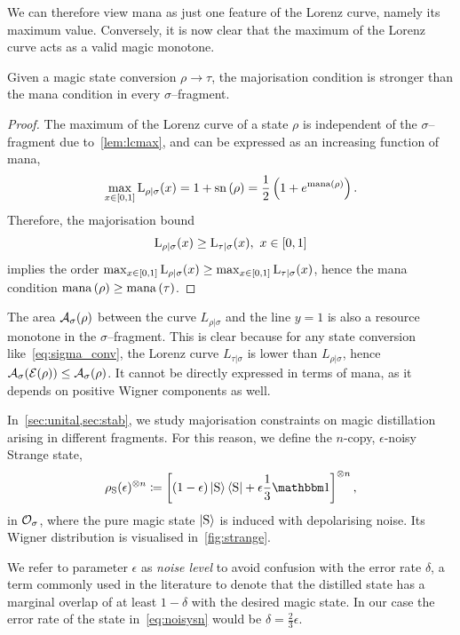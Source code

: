 \documentclass[pra,
aps,
twocolumn,
superscriptaddress,
groupedaddress,
nofootinbib,
reprint
]{revtex4-1}
\begin{document}
We can therefore view mana as just one feature of the Lorenz curve, namely its maximum value. 
Conversely, it is now clear that the maximum of the Lorenz curve acts as a valid magic monotone.
\begin{theorem}\label{thm:bounds}
    Given a magic state conversion $\rho \longrightarrow \tau$, the majorisation condition is stronger than the mana condition in every $\sigma$--fragment.
\end{theorem}
\begin{proof}
    The maximum of the Lorenz curve of a state $\rho$ is independent of the $\sigma$--fragment due to~\cref{lem:lcmax}, and can be expressed as an increasing function of mana,
    \begin{equation}
        \max_{x\in[0,1]}{{{\rm{L}}_{\rho|\sigma}}(x)} = 1 + {{\rm{sn}}\left(\rho\right)} = \frac{1}{2} \left( 1 + e^{{\rm{mana}}\left(\rho\right)} \right).
    \end{equation}
    Therefore, the majorisation bound
    \begin{equation}
    	\lc{\rho}{\sigma}(x) \geq \lc{\tau}{\sigma}(x),\ x\in[0,1]
    \end{equation}
    implies the order $\max_{x\in[0,1]}{{{\rm{L}}_{\rho|\sigma}}(x)} \geq \max_{x\in[0,1]}{{{\rm{L}}_{\tau|\sigma}}(x)}$, hence the mana condition ${{\rm{mana}}\left(\rho\right)} \geq {{\rm{mana}}\left(\tau\right)}$.
\end{proof}

The area ${\mathcal A}_\sigma(\rho)$ between the curve $L_{\rho|\sigma}$ and the line $y=1$ is also a resource monotone in the $\sigma$--fragment. 
This is clear because for any state conversion like~\cref{eq:sigma_conv}, the Lorenz curve $L_{\tau|\sigma}$ is lower than $L_{\rho|\sigma}$, hence ${\mathcal A}_\sigma(\mathcal{E}(\rho)) \leq {\mathcal A}_\sigma(\rho)$.
It cannot be directly expressed in terms of mana, as it depends on positive Wigner components as well.

In~\cref{sec:unital,sec:stab}, we study majorisation constraints on magic distillation arising in different fragments. 
For this reason, we define the $n$-copy, $\epsilon$-noisy Strange state,
\begin{equation}\label{eq:noisysn}
    \rho_{\rm{S}}(\epsilon)^{\otimes n} \coloneqq \left[ (1 - \epsilon) \ket{\rm{S}}\bra{\rm{S}} + \epsilon \frac{1}{3}\id \right]^{\otimes n},
\end{equation}
in $\mathcal{O}_\sigma$, where the pure magic state $\ket{\rm{S}}$ is induced with depolarising noise. 
Its Wigner distribution is visualised in~\cref{fig:strange}.

We refer to parameter $\epsilon$ as \emph{noise level} to avoid confusion with the error rate $\delta$, a term commonly used in the literature to denote that the distilled state has a marginal overlap of at least $1-\delta$ with the desired magic state.
In our case the error rate of the state in~\cref{eq:noisysn} would be $\delta = \frac{2}{3}\epsilon$.
\end{document}

